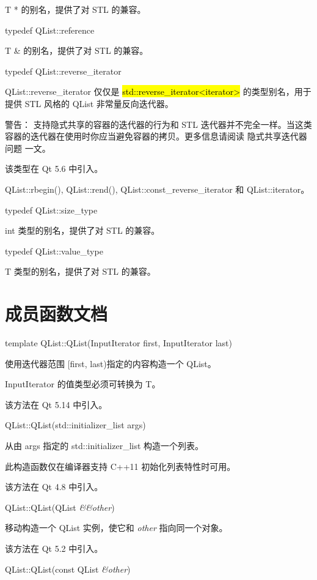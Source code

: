T * 的别名，提供了对 STL 的兼容。

typedef QList::reference

T \& 的别名，提供了对 STL 的兼容。

typedef QList::reverse\_iterator

QList::reverse\_iterator 仅仅是 \hl{std::reverse\_iterator<iterator>} 的类型别名，用于提供 STL 风格的 QList 非常量反向迭代器。

\begin{notice}
警告： 支持隐式共享的容器的迭代器的行为和 STL 迭代器并不完全一样。当这类容器的迭代器在使用时你应当避免容器的拷贝。更多信息请阅读 隐式共享迭代器问题 一文。
\end{notice}

该类型在 Qt 5.6 中引入。

\begin{notice}[另请参阅]
QList::rbegin(), QList::rend(), QList::const\_reverse\_iterator 和 QList::iterator。
\end{notice}

typedef QList::size\_type

int 类型的别名，提供了对 STL 的兼容。

typedef QList::value\_type

T 类型的别名，提供了对 STL 的兼容。

\section{成员函数文档}

template QList::QList(InputIterator first, InputIterator last)

使用迭代器范围 [first, last)指定的内容构造一个 QList。

InputIterator 的值类型必须可转换为 T。

该方法在 Qt 5.14 中引入。

QList::QList(std::initializer\_list args)

从由 args 指定的 std::initializer\_list 构造一个列表。

此构造函数仅在编译器支持 C++11 初始化列表特性时可用。

该方法在 Qt 4.8 中引入。

QList::QList(QList \emph{\&\&other})

移动构造一个 QList 实例，使它和 \emph{other} 指向同一个对象。

该方法在 Qt 5.2 中引入。

QList::QList(const QList \emph{\&other})

